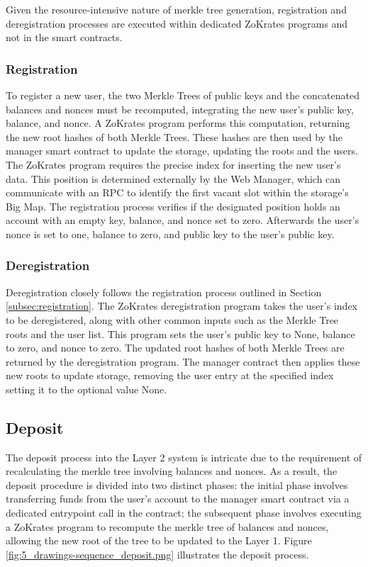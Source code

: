 Given the resource-intensive nature of merkle tree generation, registration and deregistration processes are executed within dedicated ZoKrates programs and not in the smart contracts.

\subsubsection{Registration\label{subsec:registration}}

To register a new user, the two Merkle Trees of public keys and the concatenated balances and nonces must be recomputed, integrating the new user's public key, balance, and nonce. A ZoKrates program performs this computation, returning the new root hashes of both Merkle Trees. These hashes are then used by the manager smart contract to update the storage, updating the roots and the users. The ZoKrates program requires the precise index for inserting the new user's data. This position is determined externally by the Web Manager, which can communicate with an RPC to identify the first vacant slot within the storage's Big Map. The registration process verifies if the designated position holds an account with an empty key, balance, and nonce set to zero. Afterwards the user's nonce is set to one, balance to zero, and public key to the user's public key.

\subsubsection{Deregistration}

Deregistration closely follows the registration process outlined in Section \ref{subsec:registration}. The ZoKrates deregistration program takes the user's index to be deregistered, along with other common inputs such as the Merkle Tree roots and the user list. This program sets the user's public key to None, balance to zero, and nonce to zero. The updated root hashes of both Merkle Trees are returned by the deregistration program. The manager contract then applies these new roots to update storage, removing the user entry at the specified index setting it to the optional value None.

\subsection{Deposit\label{subsec:deposit}}
The deposit process into the Layer 2 system is intricate due to the requirement of recalculating the merkle tree involving balances and nonces. As a result, the deposit procedure is divided into two distinct phases: the initial phase involves transferring funds from the user's account to the manager smart contract via a dedicated entrypoint call in the contract; the subsequent phase involves executing a ZoKrates program to recompute the merkle tree of balances and nonces, allowing the new root of the tree to be updated to the Layer 1. Figure \ref{fig:5_drawings-sequence_deposit.png} illustrates the deposit process.

